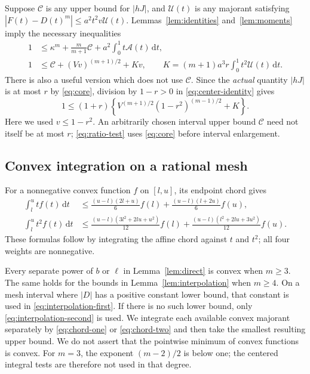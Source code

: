 \documentclass[11pt,reqno]{amsart}
\theoremstyle{definition}
\theoremstyle{remark}
\numberwithin{equation}{section}
\newcommand{\dd}{\,\mathrm d}
\begin{document}
Suppose $\mathcal C$ is any upper bound for $|hJ|$, and $\mathcal U(t)$ is any majorant satisfying $|F(t)-D(t)^m|\le a^2t^2v\mathcal U(t)$. Lemmas~\ref{lem:identities} and~\ref{lem:moments} imply the necessary inequalities
\begin{align}
 1&\le\kappa^m+\frac{m}{m+1}\mathcal C
       +a^2\int_0^1t\mathcal A(t)\dd t,\label{eq:direct-test}\\
 1&\le\mathcal C+(Vv)^{(m+1)/2}+Kv,
 \qquad K=(m+1)a^3r\int_0^1t^2\mathcal U(t)\dd t.\label{eq:absolute-test}
\end{align}
There is also a useful version which does not use $\mathcal C$. Since the \emph{actual} quantity $|hJ|$ is at most $r$ by \eqref{eq:core}, division by $1-r>0$ in \eqref{eq:center-identity} gives
\begin{equation}\label{eq:ratio-test}
 1\le(1+r)\left\{V^{(m+1)/2}(1-r^2)^{(m-1)/2}+K\right\}.
\end{equation}
Here we used $v\le1-r^2$. An arbitrarily chosen interval upper bound $\mathcal C$ need not itself be at most $r$; \eqref{eq:ratio-test} uses \eqref{eq:core} before interval enlargement.

\subsection{Convex integration on a rational mesh}

For a nonnegative convex function $f$ on $[l,u]$, its endpoint chord gives
\begin{align}
 \int_l^u tf(t)\dd t
 &\le\frac{(u-l)(2l+u)}6f(l)
      +\frac{(u-l)(l+2u)}6f(u),\label{eq:chord-one}\\
 \int_l^u t^2f(t)\dd t
 &\le\frac{(u-l)(3l^2+2lu+u^2)}{12}f(l)
      +\frac{(u-l)(l^2+2lu+3u^2)}{12}f(u).\label{eq:chord-two}
\end{align}
These formulas follow by integrating the affine chord against $t$ and $t^2$; all four weights are nonnegative.

Every separate power of $b$ or $\ell$ in Lemma~\ref{lem:direct} is convex when $m\ge3$. The same holds for the bounds in Lemma~\ref{lem:interpolation} when $m\ge4$. On a mesh interval where $|D|$ has a positive constant lower bound, that constant is used in \eqref{eq:interpolation-first}. If there is no such lower bound, only \eqref{eq:interpolation-second} is used. We integrate each available convex majorant separately by \eqref{eq:chord-one} or \eqref{eq:chord-two} and then take the smallest resulting upper bound. We do not assert that the pointwise minimum of convex functions is convex. For $m=3$, the exponent $(m-2)/2$ is below one; the centered integral tests are therefore not used in that degree.
\end{document}
